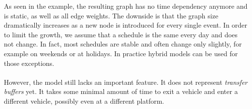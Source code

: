 	As seen in the example, the resulting graph has no time dependency anymore and is static, as well as all edge weights.
	The downside is that the graph size dramatically increases as a new node is introduced for every single event.
	In order to limit the growth, we assume that a schedule is the same every day and does not change. In fact, most schedules are
	stable and often change only slightly, for example on weekends or at holidays. In practice hybrid models can be used for
	those exceptions.\\\\
	However, the model still lacks an important feature. It does not represent \textit{transfer buffers}  yet.
	It takes some minimal amount of time to exit a vehicle and enter a different vehicle, possibly even at a different platform.
	
